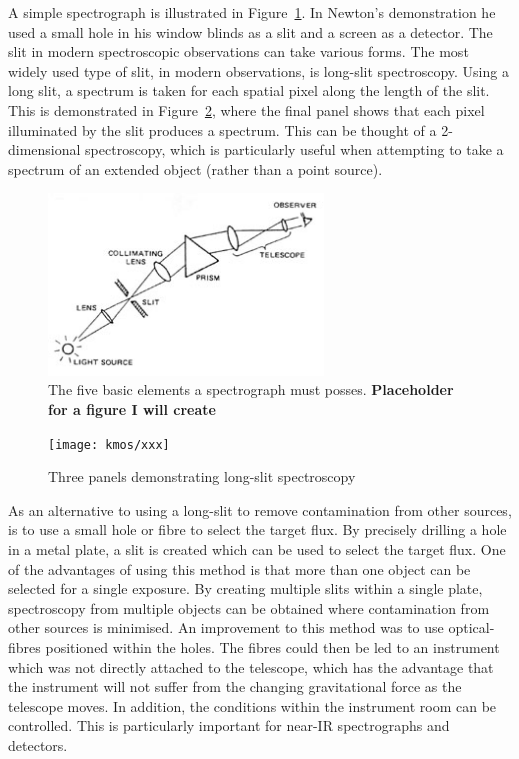 A simple spectrograph is illustrated in Figure~\ref{fig:spectrograph}.
In Newton's demonstration he used a small hole in his window blinds as a slit and a screen as a detector.
The slit in modern spectroscopic observations can take various forms.
The most widely used type of slit, in modern observations, is long-slit spectroscopy.
Using a long slit, a spectrum is taken for each spatial pixel along the length of the slit.
This is demonstrated in Figure~\ref{fig:long-slit}, where the final panel shows that each pixel illuminated by the slit produces a spectrum.
This can be thought of a 2-dimensional spectroscopy, which is particularly useful when attempting to take a spectrum of an extended object
(rather than a point source).

\begin{figure}
 \centering
 \includegraphics[width=0.65\textwidth]{kmos/spectrograph-test}
 \caption[Simple Spectrograph]{The five basic elements a spectrograph must posses.
 \textbf{Placeholder for a figure I will create}
 \label{fig:spectrograph}}
\end{figure}

\begin{figure}
 \centering
 \texttt{[image: kmos/xxx]}
 \caption[Long-slit Spectroscopy]{Three panels demonstrating long-slit spectroscopy
 \label{fig:long-slit}}
\end{figure}

As an alternative to using a long-slit to remove contamination from other sources, is to use a small hole or fibre to select the target flux.
By precisely drilling a hole in a metal plate, a slit is created which can be used to select the target flux.
One of the advantages of using this method is that more than one object can be selected for a single exposure.
By creating multiple slits within a single plate, spectroscopy from multiple objects can be obtained where contamination from other sources is minimised.
An improvement to this method was to use optical-fibres positioned within the holes.
The fibres could then be led to an instrument which was not directly attached to the telescope, which has the advantage that the instrument will not suffer from the changing gravitational force as the telescope moves.
In addition, the conditions within the instrument room can be controlled.
This is particularly important for near-IR spectrographs and detectors.

